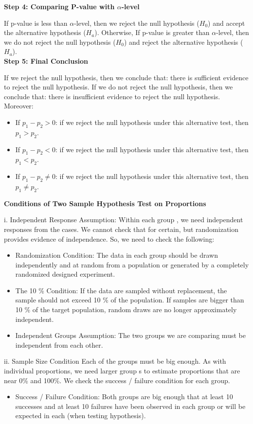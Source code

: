 \textbf{Step 4: Comparing P-value with $\alpha$-level}

If p-value is less than $\alpha$-level, then we reject the null hypothesis ($H_0$) and accept the alternative hypothesis ($H_a$). Otherwise, If p-value is greater than $\alpha$-level, then we do not reject the null hypothesis ($H_0$) and reject the alternative hypothesis ($H_a$).\\

\textbf{Step 5: Final Conclusion}

If we reject the null hypothesis, then we conclude that: there is sufficient evidence to reject the null hypothesis. If we do not reject the null hypothesis, then we conclude that: there is insufficient evidence to reject the null hypothesis. Moreover: 

\begin{itemize}
	\item If $p_1 - p_2 > 0$: if we reject the null hypothesis under this alternative test, then $p_1 > p_2$.
	\item If $p_1- p_2 < 0$: if we reject the null hypothesis under this alternative test, then $p_1 < p_2$.
	\item If $p_1 - p_2 \neq 0$: if we reject the null hypothesis under this alternative test, then $p_1 \neq p_2$.
\end{itemize}

\textbf{Conditions of Two Sample Hypothesis Test on Proportions}

i. Independent Response Assumption:
Within each group , we need independent responses from the cases. We cannot check that for certain, but randomization provides evidence of independence. So, we need to check the following:
\begin{itemize}
	\item Randomization Condition: The data in each group should be drawn independently and at random from a population or generated by a completely randomized designed experiment.
	\item The 10 \% Condition: If the data are sampled without replacement, the sample should not exceed 10 \% of the population. If samples are bigger than 10 \% of the target population, random draws are no longer approximately independent.
	\item Independent Groups Assumption: The two groups we are comparing must be independent from each other.
\end{itemize}

ii. Sample Size Condition Each of the groups must be big enough. As with individual proportions, we need larger group s to estimate proportions that are near 0\% and 100\%. We check the success / failure condition for each group.
\begin{itemize}
	\item Success / Failure Condition: Both groups are big enough that at least 10 successes and at least 10 failures have been observed in each group or will be expected in each (when testing hypothesis).
\end{itemize}


